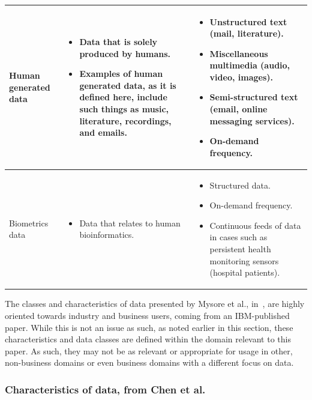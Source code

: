 \documentclass[a4paper,11pt]{article}
\begin{document}
\begin{tabular}{ | p{1.5cm} | p{8cm} | p{8cm} | }
  Human generated data
  &
  \begin{itemize}
    \item Data that is solely produced by humans.
    \item Examples of human generated data, as it is defined here, include such things as music, literature, recordings,
    and emails.
  \end{itemize}
  &
  \begin{itemize}
    \item Unstructured text (mail, literature).
    \item Miscellaneous multimedia (audio, video, images).
    \item Semi-structured text (email, online messaging services).
    \item On-demand frequency.
  \end{itemize}
  \\ \hline

  Biometrics data
  &
  \begin{itemize}
    \item Data that relates to human bioinformatics.
  \end{itemize}
  &
  \begin{itemize}
    \item Structured data.
    \item On-demand frequency.
    \item Continuous feeds of data in cases such as persistent health monitoring sensors (\ie{}hospital patients).
  \end{itemize}
  \\ \hline

\end{tabular}
\endgroup
\hspace*{5cm}

The classes and characteristics of data presented by Mysore et al., in~\cite{ibm_big_2013}, are highly oriented towards
industry and business users, coming from an IBM-published paper. While this is not an issue as such, as noted earlier
in this section, these characteristics and data classes are defined within the domain relevant to this paper. As such,
they may not be as relevant or appropriate for usage in other, non-business domains or even business domains with a
different focus on data.



\subsubsection{Characteristics of data, from Chen et al.} %
\label{ssub:characteristics_of_data_from_chen_et_al_}
\end{document}
